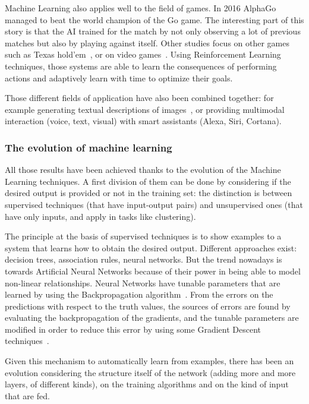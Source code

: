 Machine Learning also applies well to the field of games. In 2016 AlphaGo~\cite{chouard2016go} managed to beat the world champion of the Go game. The interesting part of this story is that the AI trained for the match by not only observing a lot of previous matches but also by playing against itself. Other studies focus on other games such as Texas hold'em~\cite{brown2017superhuman}, or on video games~\cite{mnih2015human}. Using Reinforcement Learning techniques, those systems are able to learn the consequences of performing actions and adaptively learn with time to optimize their goals.

Those different fields of application have also been combined together: for example generating textual descriptions of images~\cite{xu2015show}, or providing multimodal interaction (voice, text, visual) with smart assistants (Alexa, Siri, Cortana).

\subsubsection{The evolution of machine learning}
All those results have been achieved thanks to the evolution of the Machine Learning techniques.
A first division of them can be done by considering if the desired output is provided or not in the training set: the distinction is between supervised techniques (that have input-output pairs) and unsupervised ones (that have only inputs, and apply in tasks like clustering).

The principle at the basis of supervised techniques is to show examples to a system that learns how to obtain the desired output. Different approaches exist: decision trees, association rules, neural networks. But the trend nowadays is towards Artificial Neural Networks because of their power in being able to model non-linear relationships. Neural Networks have tunable parameters that are learned by using the Backpropagation algorithm~\cite{rumelhart1986learning}. From the errors on the predictions with respect to the truth values, the sources of errors are found by evaluating the backpropagation of the gradients, and the tunable parameters are modified in order to reduce this error by using some Gradient Descent techniques~\cite{bottou2010large}.

Given this mechanism to automatically learn from examples, there has been an evolution considering the structure itself of the network (adding more and more layers, of different kinds), on the training algorithms and on the kind of input that are fed.

